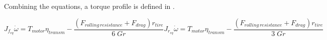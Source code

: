 Combining the equations, a torque profile is defined in .

\begin{subequations}
	\begin{equation}
		J_{f_{eq}}\dot{\omega} = T_{motor}\eta_{transm}  - \frac{\left(F_{rolling\,resistance}+F_{drag}\right)r_{tire}}{6\;Gr}
	\end{equation}
	\begin{equation}
		J_{r_{eq}}\dot{\omega} = T_{motor}\eta_{transm}  - \frac{\left(F_{rolling\,resistance}+F_{drag}\right)r_{tire}}{3\;Gr}
	\end{equation}
	\label{eq:load_profile}
\end{subequations}
